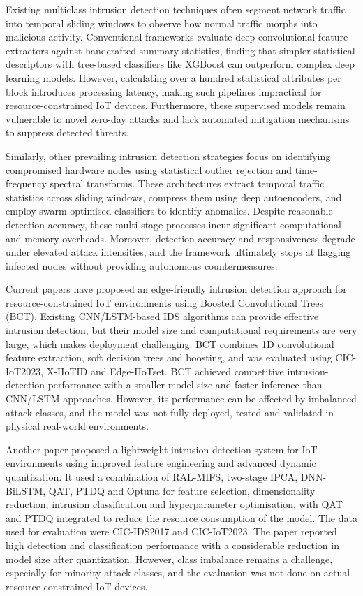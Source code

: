 \documentclass[]{interact}
\theoremstyle{plain}%
\theoremstyle{definition}
\theoremstyle{remark}
\begin{document}
Existing multiclass intrusion detection techniques often segment network traffic into temporal sliding windows to observe how normal traffic morphs into malicious activity\cite{whffi2026}. Conventional frameworks evaluate deep convolutional feature extractors against handcrafted summary statistics, finding that simpler statistical descriptors with tree-based classifiers like XGBoost can outperform complex deep learning models. However, calculating over a hundred statistical attributes per block introduces processing latency, making such pipelines impractical for resource-constrained IoT devices. Furthermore, these supervised models remain vulnerable to novel zero-day attacks and lack automated mitigation mechanisms to suppress detected threats.

Similarly, other prevailing intrusion detection strategies focus on identifying compromised hardware nodes using statistical outlier rejection and time-frequency spectral transforms\cite{wtai2025}. These architectures extract temporal traffic statistics across sliding windows, compress them using deep autoencoders, and employ swarm-optimised classifiers to identify anomalies. Despite reasonable detection accuracy, these multi-stage processes incur significant computational and memory overheads. Moreover, detection accuracy and responsiveness degrade under elevated attack intensities, and the framework ultimately stops at flagging infected nodes without providing autonomous countermeasures.

Current papers have proposed an edge-friendly intrusion detection approach for resource-constrained IoT environments using Boosted Convolutional Trees (BCT)\cite{eict2025}. Existing CNN/LSTM-based IDS algorithms can provide effective intrusion detection, but their model size and computational requirements are very large, which makes deployment challenging. BCT combines 1D convolutional feature extraction, soft decision trees and boosting, and was evaluated using CIC-IoT2023, X-IIoTID and Edge-IIoTset. BCT achieved competitive intrusion-detection performance with a smaller model size and faster inference than CNN/LSTM approaches. However, its performance can be affected by imbalanced attack classes, and the model was not fully deployed, tested and validated in physical real-world environments.

Another paper proposed a lightweight intrusion detection system for IoT environments using improved feature engineering and advanced dynamic quantization\cite{lidsfiot2025}. It used a combination of RAL-MIFS, two-stage IPCA, DNN-BiLSTM, QAT, PTDQ and Optuna for feature selection, dimensionality reduction, intrusion classification and hyperparameter optimisation, with QAT and PTDQ integrated to reduce the resource consumption of the model. The data used for evaluation were CIC-IDS2017 and CIC-IoT2023. The paper reported high detection and classification performance with a considerable reduction in model size after quantization. However, class imbalance remains a challenge, especially for minority attack classes, and the evaluation was not done on actual resource-constrained IoT devices.
\end{document}

